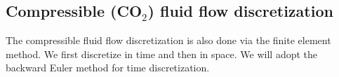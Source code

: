 
\subsection{Compressible (CO$_2$) fluid flow discretization}
\label{sec:CO2-discretization}
The compressible fluid flow discretization is also done via the finite element method. We first discretize in time and then in space. We will adopt the backward Euler method for time discretization.



